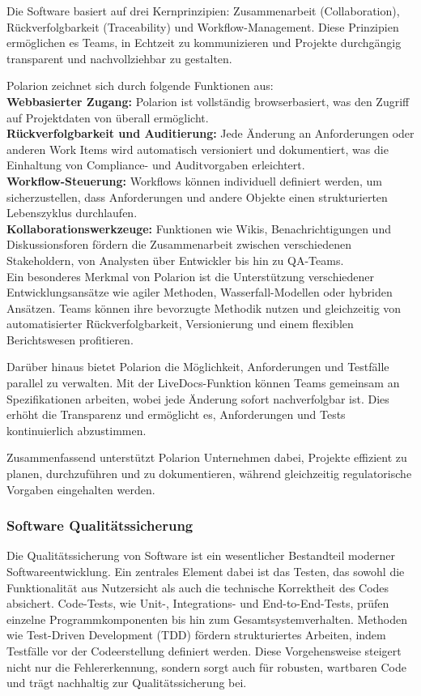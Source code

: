 \documentclass[a4paper, 12pt]{article}
\begin{document}
Die Software basiert auf drei Kernprinzipien: Zusammenarbeit (Collaboration), Rückverfolgbarkeit (Traceability) und Workflow-Management. Diese Prinzipien ermöglichen es Teams, in Echtzeit zu kommunizieren und Projekte durchgängig transparent und nachvollziehbar zu gestalten.

Polarion zeichnet sich durch folgende Funktionen aus:\\
\textbf{Webbasierter Zugang:} Polarion ist vollständig browserbasiert, was den Zugriff auf Projektdaten von überall ermöglicht.\\
\textbf{Rückverfolgbarkeit und Auditierung:} Jede Änderung an Anforderungen oder anderen Work Items wird automatisch versioniert und dokumentiert, was die Einhaltung von Compliance- und Auditvorgaben erleichtert.\\
\textbf{Workflow-Steuerung:} Workflows können individuell definiert werden, um sicherzustellen, dass Anforderungen und andere Objekte einen strukturierten Lebenszyklus durchlaufen.\\
\textbf{Kollaborationswerkzeuge:} Funktionen wie Wikis, Benachrichtigungen und Diskussionsforen fördern die Zusammenarbeit zwischen verschiedenen Stakeholdern, von Analysten über Entwickler bis hin zu QA-Teams.\\
Ein besonderes Merkmal von Polarion ist die Unterstützung verschiedener Entwicklungsansätze wie agiler Methoden, Wasserfall-Modellen oder hybriden Ansätzen. Teams können ihre bevorzugte Methodik nutzen und gleichzeitig von automatisierter Rückverfolgbarkeit, Versionierung und einem flexiblen Berichtswesen profitieren.

Darüber hinaus bietet Polarion die Möglichkeit, Anforderungen und Testfälle parallel zu verwalten. Mit der LiveDocs-Funktion können Teams gemeinsam an Spezifikationen arbeiten, wobei jede Änderung sofort nachverfolgbar ist. Dies erhöht die Transparenz und ermöglicht es, Anforderungen und Tests kontinuierlich abzustimmen.

Zusammenfassend unterstützt Polarion Unternehmen dabei, Projekte effizient zu planen, durchzuführen und zu dokumentieren, während gleichzeitig regulatorische Vorgaben eingehalten werden. \cite{polarion_web}


\subsubsection{Software Qualitätssicherung}
Die Qualitätssicherung von Software ist ein wesentlicher Bestandteil moderner Softwareentwicklung. Ein zentrales Element dabei ist das Testen, das sowohl die Funktionalität aus Nutzersicht als auch die technische Korrektheit des Codes absichert. Code-Tests, wie Unit-, Integrations- und End-to-End-Tests, prüfen einzelne Programmkomponenten bis hin zum Gesamtsystemverhalten. Methoden wie Test-Driven Development (TDD) fördern strukturiertes Arbeiten, indem Testfälle vor der Codeerstellung definiert werden. Diese Vorgehensweise steigert nicht nur die Fehlererkennung, sondern sorgt auch für robusten, wartbaren Code und trägt nachhaltig zur Qualitätssicherung bei. \cite{grundlagen_sw_entwicklung}
\end{document}
